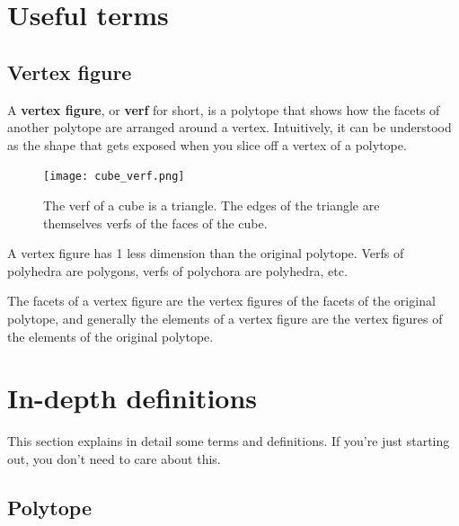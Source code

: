 \documentclass{article}
\begin{document}
\section{Useful terms}

\subsection{Vertex figure}
\label{verf}

A \textbf{vertex figure}, or \textbf{verf} for short, is a polytope that shows how
the facets of another polytope are arranged around a vertex. Intuitively, it can
be understood as the shape that gets exposed when you slice off a vertex of a polytope.

\begin{figure}[H]
  \centering
  \texttt{[image: cube\_verf.png]}
  \caption{The verf of a cube is a triangle. The edges of the triangle are
  themselves verfs of the faces of the cube.}
\end{figure}

A vertex figure has 1 less dimension than the original polytope. Verfs of polyhedra are
polygons, verfs of polychora are polyhedra, etc.

The facets of a vertex figure are the vertex figures of the facets of the original polytope,
and generally the elements of a vertex figure are the vertex figures of the elements of the
original polytope.

\section{In-depth definitions}
\label{indepth}

This section explains in detail some terms and definitions. If you're just starting out, you
don't need to care about this.

\subsection{Polytope}
\end{document}
